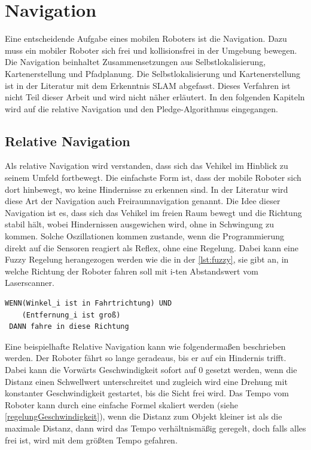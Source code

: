 \section{Navigation}\label{subsec:Navigation}
Eine entscheidende Aufgabe eines mobilen Roboters ist die Navigation. Dazu muss ein mobiler Roboter sich frei und kollisionsfrei in der Umgebung bewegen. Die Navigation beinhaltet Zusammensetzungen aus Selbstlokalisierung, Kartenerstellung und Pfadplanung. Die Selbstlokalisierung und Kartenerstellung ist in der Literatur mit dem Erkenntnis SLAM abgefasst. Dieses Verfahren ist nicht Teil dieser Arbeit und wird nicht näher erläutert. In den folgenden Kapiteln wird auf die relative Navigation und den Pledge-Algorithmus eingegangen.\autocites[S.261ff]{RobotikSichtInformatik.2012}[S.97f]{MobileRobotikEinfuehrung.2002}
\subsection{Relative Navigation}
Als relative Navigation wird verstanden, dass sich das Vehikel im Hinblick zu seinem Umfeld fortbewegt. Die einfachste Form ist, dass der mobile Roboter sich dort hinbewegt, wo keine Hindernisse zu erkennen sind. In der Literatur wird diese Art der Navigation auch Freiraumnavigation genannt. Die Idee dieser Navigation ist es, dass sich das Vehikel im freien Raum bewegt und die Richtung stabil hält, wobei Hindernissen ausgewichen wird, ohne in Schwingung zu kommen. Solche Oszillationen kommen zustande, wenn die Programmierung direkt auf die Sensoren reagiert als Reflex, ohne eine Regelung.
Dabei kann eine Fuzzy Regelung herangezogen werden wie die in der \autoref{lst:fuzzy}, sie gibt an, in welche Richtung der Roboter fahren soll mit i-ten Abstandswert vom Laserscanner. 
 \begin{lstlisting}[caption={Fuzzy Regelung \cite{RobotikSichtInformatik.2012, S.266}}, label={lst:fuzzy},captionpos=b,xleftmargin=.3\linewidth]
 WENN(Winkel_i ist in Fahrtrichtung) UND
    (Entfernung_i ist groß) 
 DANN fahre in diese Richtung
 \end{lstlisting}

Eine beispielhafte Relative Navigation kann wie folgendermaßen beschrieben werden. Der Roboter fährt so lange geradeaus, bis er auf ein Hindernis trifft. Dabei kann die Vorwärts Geschwindigkeit sofort auf 0 gesetzt werden, wenn die Distanz einen Schwellwert unterschreitet und zugleich wird eine Drehung mit konstanter Geschwindigkeit gestartet, bis die Sicht frei wird. Das Tempo vom Roboter kann durch eine einfache Formel skaliert werden (siehe \autoref{regelungGeschwindigkeit}), wenn die Distanz zum Objekt kleiner ist als die maximale Distanz, dann wird das Tempo verhältnismäßig geregelt, doch falls alles frei ist, wird mit dem größten Tempo gefahren. 

